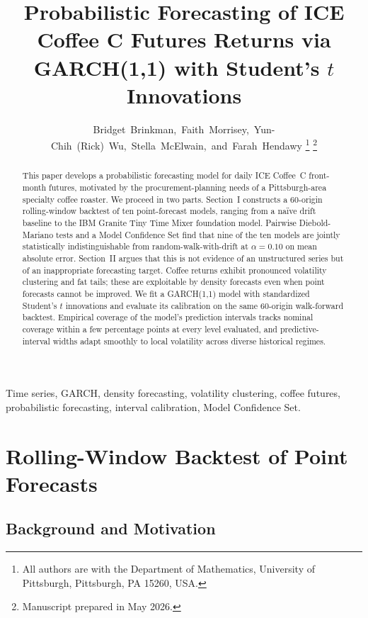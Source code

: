 \documentclass[journal]{IEEEtran}
\title{Probabilistic Forecasting of ICE Coffee C Futures Returns via GARCH(1,1) with Student's $t$ Innovations}
\author{%
  Bridget~Brinkman,~Faith~Morrisey,~Yun-Chih~(Rick)~Wu,~Stella~McElwain,~and~Farah~Hendawy%
  \thanks{All authors are with the Department of Mathematics, University of Pittsburgh, Pittsburgh, PA 15260, USA.}%
  \thanks{Manuscript prepared in May 2026.}
}
\begin{document}
\maketitle

\begin{abstract}
This paper develops a probabilistic forecasting model for daily
ICE Coffee~C front-month futures, motivated by the procurement-planning
needs of a Pittsburgh-area specialty coffee roaster.  We proceed in two
parts.  Section~I constructs a 60-origin rolling-window backtest of ten
point-forecast models, ranging from a na\"ive drift baseline to the IBM
Granite Tiny Time Mixer foundation model.  Pairwise Diebold-Mariano tests
and a Model Confidence Set find that nine of the ten models are jointly
statistically indistinguishable from random-walk-with-drift at $\alpha=0.10$
on mean absolute error.  Section~II argues that this is not evidence of an
unstructured series but of an inappropriate forecasting target.  Coffee
returns exhibit pronounced volatility clustering and fat tails; these are
exploitable by density forecasts even when point forecasts cannot be
improved.  We fit a GARCH(1,1) model with standardized Student's $t$
innovations and evaluate its calibration on the same 60-origin walk-forward
backtest.  Empirical coverage of the model's prediction intervals tracks
nominal coverage within a few percentage points at every level evaluated,
and predictive-interval widths adapt smoothly to local volatility across
diverse historical regimes.
\end{abstract}

\begin{IEEEkeywords}
Time series, GARCH, density forecasting, volatility clustering, coffee
futures, probabilistic forecasting, interval calibration, Model Confidence Set.
\end{IEEEkeywords}

\section{Rolling-Window Backtest of Point Forecasts}
\label{sec:section1}

\subsection{Background and Motivation}
\label{sec:motivation_intro}
\end{document}

